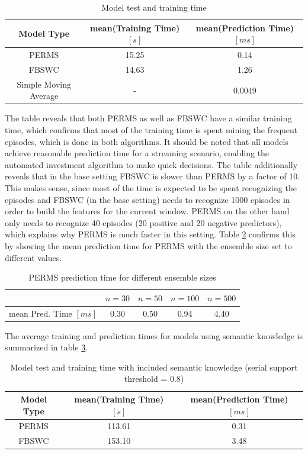 \begin{table}	
\caption{Model test and training time \label{table_runtimeVals}}
\begin{tabular}{ c | c | c}		
  Model Type & mean(Training Time) $[s]$ & mean(Prediction Time) $[ms]$ \\
  \hline
  PERMS & 15.25 & 0.14\\
  FBSWC & 14.63 & 1.26\\
  Simple Moving Average & - & 0.0049\\
\end{tabular}
\end{table}

The table reveals that both PERMS as well as FBSWC have a similar training time, which confirms that most of the training time is spent mining the frequent episodes, which is done in both algorithms. It should be noted that all models achieve reasonable prediction time for a streaming scenario, enabling the automated investment algorithm to make quick decisions. The table additionally reveals that in the base setting FBSWC is slower than PERMS by a factor of 10. This makes sense, since most of the time is expected to be spent recognizing the episodes and FBSWC (in the base setting) needs to recognize 1000 episodes in order to build the features for the current window. PERMS on the other hand only needs to recognize 40 episodes (20 positive and 20 negative predictors), which explains why PERMS is much faster in this setting. Table \ref{table_runtimeValsEnsembleSize} confirms this by showing the mean prediction time for PERMS with the ensemble size set to different values.

\begin{table}
\caption{PERMS prediction time for different ensemble sizes  \label{table_runtimeValsEnsembleSize}}
\begin{tabular}{ c | c | c | c | c}		
   & $n=30$ & $n=50$ & $n=100$ & $n=500$\\
  \hline
  mean Pred. Time $[ms]$ & 0.30 & 0.50 & 0.94 & 4.40\\
\end{tabular}
\end{table}

The average training and prediction times for models using semantic knowledge is summarized in table \ref{table_runtimeValsSemantic}.

\begin{table}
\caption{Model test and training time with included semantic knowledge (serial support threshold = $0.8$) \label{table_runtimeValsSemantic}}
\begin{tabular}{ c | c | c}		
  Model Type & mean(Training Time) $[s]$ & mean(Prediction Time) $[ms]$ \\
  \hline
  PERMS & 113.61 & 0.31\\
  FBSWC & 153.10 & 3.48\\
\end{tabular}
\end{table}

